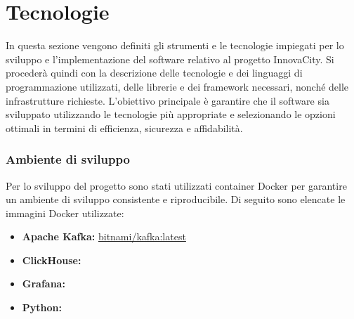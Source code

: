 \section{Tecnologie}
In questa sezione vengono definiti gli strumenti e le tecnologie impiegati per lo sviluppo e l'implementazione del software relativo al progetto InnovaCity. Si procederà quindi con la descrizione delle tecnologie e dei linguaggi di programmazione utilizzati, delle librerie e dei framework necessari, nonché delle infrastrutture richieste. L'obiettivo principale è garantire che il software sia sviluppato utilizzando le tecnologie più appropriate e selezionando le opzioni ottimali in termini di efficienza, sicurezza e affidabilità.

\subsubsection{Ambiente di sviluppo}
Per lo sviluppo del progetto sono stati utilizzati container Docker per garantire un ambiente di sviluppo consistente e riproducibile. Di seguito sono elencate le immagini Docker utilizzate:

\begin{itemize}
  \item \textbf{Apache Kafka:} \href{https://hub.docker.com/layers/bitnami/kafka/latest/images/sha256-4894d89d28f8e06a7d8a064efdc2dc9cb61dd205721c61296b6d033ad4824a91?context=explore}{bitnami/kafka:latest}
  \item \textbf{ClickHouse:} 
  \item \textbf{Grafana:} 
  \item \textbf{Python:} 
\end{itemize}






